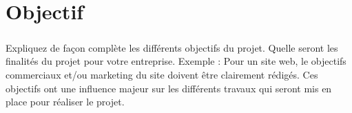 \chapter{Objectif}
\paragraph{}
Expliquez de façon complète les différents objectifs du projet. Quelle seront les finalités du projet pour votre entreprise. Exemple : Pour un site web, le objectifs commerciaux et/ou marketing du site doivent être clairement rédigés. Ces objectifs ont une influence majeur sur les différents travaux qui seront mis en place pour réaliser le projet.